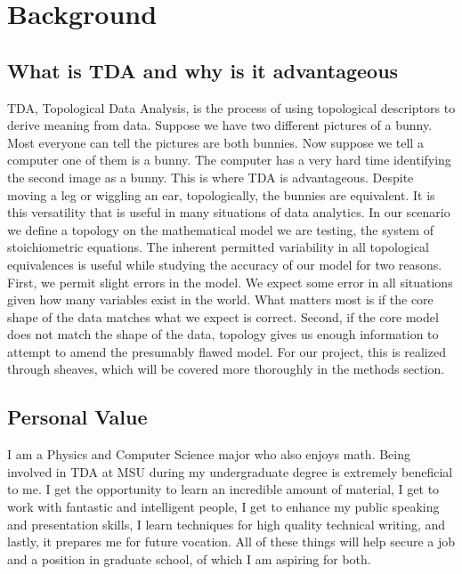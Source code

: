 \documentclass[10.5pt]{article}
\begin{document}


\section{Background}
\subsection{What is TDA and why is it advantageous}
TDA, Topological Data Analysis, is the process of using topological descriptors to derive meaning from data. Suppose we have two different pictures of a bunny. Most everyone can tell the pictures are both bunnies. Now suppose we tell a computer one of them is a bunny. The computer has a very hard time identifying the second image as a bunny. This is where TDA is advantageous. Despite moving a leg or wiggling an ear, topologically, the bunnies are equivalent. It is this versatility that is useful in many situations of data analytics. In our scenario we define a topology on the mathematical model we are testing, the system of stoichiometric equations. The inherent permitted variability in all topological equivalences is useful while studying the accuracy of our model for two reasons. First, we permit slight errors in the model. We expect some error in all situations given how many variables exist in the world. What matters most is if the core shape of the data matches what we expect is correct. Second, if the core model does not match the shape of the data, topology gives us enough information to attempt to amend the presumably flawed model. For our project, this is realized through sheaves, which will be covered more thoroughly in the methods section.

\subsection{Personal Value}
I am a Physics and Computer Science major who also enjoys math. Being involved in TDA at MSU during my undergraduate degree is extremely beneficial to me. I get the opportunity to learn an incredible amount of material, I get to work with fantastic and intelligent people, I get to enhance my public speaking and presentation skills, I learn techniques for high quality technical writing, and lastly, it prepares me for future vocation. All of these things will help secure a job and a position in graduate school, of which I am aspiring for both. 
\end{document}
